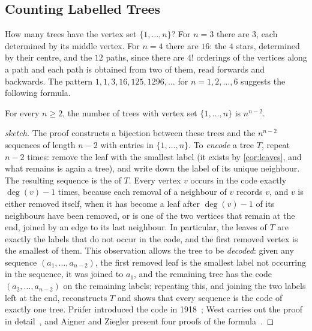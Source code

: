 \subsection{Counting Labelled Trees}

How many trees have the vertex set $\{1,\ldots,n\}$? For $n=3$ there are $3$, each determined by its middle vertex. For $n=4$ there are $16$: the $4$ stars, determined by their centre, and the $12$ paths, since there are $4!$ orderings of the vertices along a path and each path is obtained from two of them, read forwards and backwards. The pattern $1,1,3,16,125,1296,\ldots$ for $n=1,2,\ldots,6$ suggests the following formula.

\begin{theorem}
\label{thm:cayley}
For every $n\ge2$, the number of trees with vertex set $\{1,\ldots,n\}$ is $n^{n-2}$.
\end{theorem}

\begin{proof}[sketch]
The proof constructs a bijection between these trees and the $n^{n-2}$ sequences of length $n-2$ with entries in $\{1,\ldots,n\}$. To \emph{encode} a tree $T$, repeat $n-2$ times: remove the leaf with the smallest label (it exists by \cref{cor:leaves}, and what remains is again a tree), and write down the label of its unique neighbour. The resulting sequence is the  of $T$. Every vertex $v$ occurs in the code exactly $\deg(v)-1$ times, because each removal of a neighbour of $v$ records $v$, and $v$ is either removed itself, when it has become a leaf after $\deg(v)-1$ of its neighbours have been removed, or is one of the two vertices that remain at the end, joined by an edge to its last neighbour. In particular, the leaves of $T$ are exactly the labels that do not occur in the code, and the first removed vertex is the smallest of them. This observation allows the tree to be \emph{decoded}: given any sequence $(a_1,\ldots,a_{n-2})$, the first removed leaf is the smallest label not occurring in the sequence, it was joined to $a_1$, and the remaining tree has the code $(a_2,\ldots,a_{n-2})$ on the remaining labels; repeating this, and joining the two labels left at the end, reconstructs $T$ and shows that every sequence is the code of exactly one tree. Pr\"ufer introduced the code in 1918~\cite{prufer1918}; West carries out the proof in detail~\cite[Sect.~2.2]{west2001}, and Aigner and Ziegler present four proofs of the formula~\cite{aigner2018proofs}.
\end{proof}

